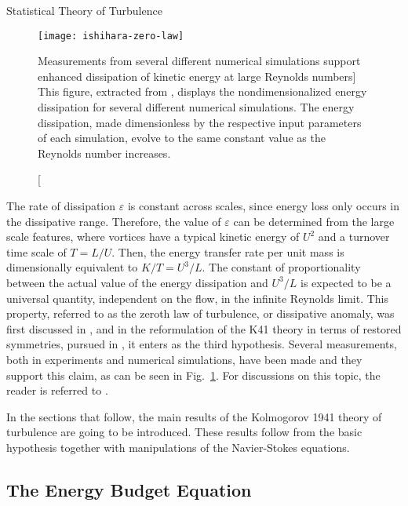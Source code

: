 \begin{chapter}{Statistical Theory of Turbulence}
\begin{figure}[ht]
	\centering
	\texttt{[image: ishihara-zero-law]}
	\caption
	[Measurements from several different numerical simulations support enhanced dissipation of kinetic energy at large Rey\-nolds numbers]
	{This figure, extracted from
	\textcite{ishihara2009}, displays the nondimensionalized energy dissipation
	for several different numerical simulations.
	The energy dissipation, made dimensionless by
	the respective input parameters of each simulation, evolve
	to the same constant value as the Reynolds number increases.
	}
	\label{fig:zero-law}
\end{figure}

The rate of dissipation $\varepsilon$ is constant across scales,
since energy loss only occurs in the dissipative range.
Therefore, the value of $\varepsilon$ can be determined from
the large scale features, where vortices have a typical kinetic energy of $U^2$
and a turnover time scale of $T=L/U$. Then, the energy transfer rate per unit mass is dimensionally equivalent to $K/T = U^3 / L$.
The constant of proportionality between the actual value of the energy dissipation and $U^3/L$ is expected to be a universal quantity, independent on the flow, in the infinite Reynolds limit. This property, referred to as the zeroth law of turbulence, or dissipative anomaly, was first discussed in \textcite{dryden1943review}, and in the reformulation of the K41 theory in terms of restored symmetries, pursued in \textcite{frisch1991global}, it enters as the third hypothesis.
Several measurements, both in experiments and numerical
simulations, have been made and they support this claim,
as can be seen in Fig.~\ref{fig:zero-law}.
For discussions on this topic, the reader is referred to
\textcite{cadot1997energy,sreenivasan1984scaling,sreenivasan1998update,pearson2002measurements,kaneda2003energy}.

In the sections that follow, the main results
of the Kolmogorov 1941 theory of turbulence are going to be introduced.
These results follow from the basic hypothesis together
with manipulations of the Navier-Stokes equations.

\subsection{The Energy Budget Equation}


\end{chapter}

